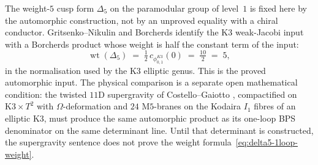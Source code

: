 \begin{remark}
\label{rem:arith-shad-5}%
%
%
%
%
The weight-$5$ cusp form $\Delta_5$ on the paramodular group of
level~$1$ is fixed here by the automorphic construction, not by an
unproved equality with a chiral conductor. Gritsenko--Nikulin and
Borcherds identify the K3 weak-Jacobi input with a Borcherds product
whose weight is half the constant term of the input:
\begin{equation}\label{eq:delta5-1loop-weight}
 \operatorname{wt}(\Delta_5)
 \;=\;
 \tfrac12\,c_{\phi_{0,1}^{K3}}(0)
 \;=\;
 \tfrac{10}{2}
 \;=\;
 5,
\end{equation}
in the normalisation used by the K3 elliptic genus. This is the
proved automorphic input. The physical comparison is a separate
open mathematical condition: the twisted $11$D supergravity of
Costello--Gaiotto \cite{CostelloGaiotto2021}, compactified on
$\mathrm{K3} \times T^2$ with $\Omega$-deformation and $24$
$\mathrm{M}5$-branes on the Kodaira $I_1$ fibres of an elliptic
$\mathrm{K3}$, must produce the same automorphic product as its
one-loop BPS denominator on the same determinant line. Until that
determinant is constructed, the supergravity sentence does not prove
the weight formula~\eqref{eq:delta5-1loop-weight}.


\end{remark}
